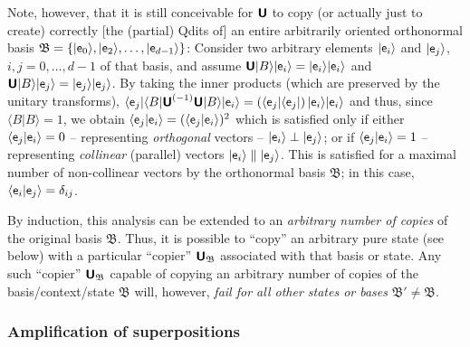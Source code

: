\documentclass[%
  preprint,
 showpacs,
 showkeys,
 preprintnumbers,
 amsmath,amssymb,
 aps,
   pra,
  longbibliography,
 ]{revtex4-1}
\begin{document}
Note, however, that it is still conceivable for  $\textsf{\textbf{U}}$ to copy (or actually just to create) correctly [the (partial) Qdits of]
an entire arbitrarily oriented orthonormal basis
${\mathfrak B} =\{ \vert {\textsf e}_0 \rangle, \vert {\textsf e}_2 \rangle, \ldots , \vert {\textsf e}_{d-1} \rangle \}$:
Consider two arbitrary elements
$\vert {\textsf e}_i \rangle$ and $\vert {\textsf e}_j \rangle$,   $i,j=0,\ldots , d-1$ of that basis, and assume
$\textsf{\textbf{U}}  \vert B \rangle \vert {\textsf e}_i \rangle    = \vert {\textsf e}_i \rangle \vert {\textsf e}_i \rangle $
and
$\textsf{\textbf{U}}  \vert B \rangle \vert {\textsf e}_j \rangle    = \vert {\textsf e}_j \rangle \vert {\textsf e}_j \rangle $.
By taking the inner products (which are preserved by the unitary transforms),
$
 \langle {\textsf e}_j \vert \langle   B \vert     \textsf{\textbf{U}}^{(-1)}
\textsf{\textbf{U}}  \vert B \rangle \vert {\textsf e}_i \rangle
=
\left( \langle {\textsf e}_j \vert \langle   {\textsf e}_j \vert \right)
\vert {\textsf e}_i \rangle \vert {\textsf e}_i \rangle$
and thus, since
$\langle   B \vert   B \rangle =1$,
we obtain
$
\langle {\textsf e}_j \vert  {\textsf e}_i \rangle
=
(\langle {\textsf e}_j \vert  {\textsf e}_i \rangle )^2
$
which is satisfied only if either
$
\langle {\textsf e}_j \vert  {\textsf e}_i \rangle
=
0
$
--
representing {\em orthogonal} vectors
--
$\vert{\textsf e}_i\rangle
\perp
\vert{\textsf e}_j\rangle  $;
or if
$
\langle {\textsf e}_j \vert  {\textsf e}_i \rangle
=
1
$
--
representing {\em collinear} (parallel) vectors $\vert{\textsf e}_i\rangle
\parallel
\vert{\textsf e}_j\rangle  $.
This is satisfied for a maximal number of non-collinear vectors
by the orthonormal basis
${\mathfrak B}$; in this case,
$
\langle {\textsf e}_i \vert  {\textsf e}_j \rangle
=\delta_{ij}$.

By induction, this analysis can be extended to an {\em arbitrary number of copies} of the original basis
${\mathfrak B}$.
Thus, it is possible to ``copy'' an arbitrary pure state (see below) with a particular ``copier''
$\textsf{\textbf{U}}_{\mathfrak B}$
associated with that basis or state.
Any such  ``copier''
$\textsf{\textbf{U}}_{\mathfrak B}$ capable of copying an arbitrary number of copies of the basis/context/state ${\mathfrak B}$ will, however,
{\em fail for all other states or bases}  ${\mathfrak B}' \neq {\mathfrak B}$.



\subsubsection{Amplification of superpositions}
\end{document}
